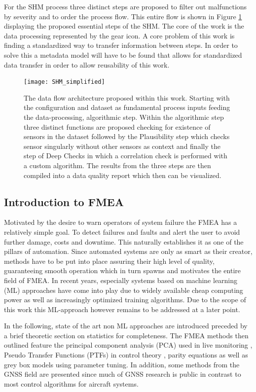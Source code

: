 For the SHM process three distinct steps are proposed to filter out malfunctions by severity and to order the process flow. This entire flow is shown in Figure \ref{fig:SHM_simplified} displaying the proposed essential  steps of the SHM. The core of the work is the data processing represented by the gear icon. A core problem of this work is finding a standardized way to transfer information between steps. In order to solve this a metadata model will have to be found that allows for standardized data transfer in order to allow reusability of this work.
\begin{figure}[!h]
    \centering
    \texttt{[image: SHM\_simplified]}
    \caption[The general, proposed SHM Architecture]{The data flow architecture proposed within this work. Starting with the configuration and dataset as fundamental process inputs feeding the data-processing, algorithmic step. Within the algorithmic step three distinct functions are proposed checking for existence of sensors in the dataset followed by the Plausibility step which checks sensor singularly without other sensors as context and finally the step of Deep Checks in which a correlation check is performed with a custom algorithm. The results from the three steps are then compiled into a data quality report which then can be visualized.}
    \label{fig:SHM_simplified}
\end{figure}

\subsection{Introduction to FMEA}

Motivated by the desire to warn operators of system failure the FMEA has a relatively simple goal. To detect failures and faults and alert the user to avoid further damage, costs and downtime. This naturally establishes it as one of the pillars of automation. \cite{isermann_fault-diagnosis_2006} Since automated systems are only as smart as their creator, methods have to be put into place assuring their high level of quality, guaranteeing smooth operation which in turn spawns and motivates the entire field of FMEA. In recent years, especially systems based on machine learning (ML) approaches have come into play due to widely available cheap computing power as well as increasingly optimized training algorithms. Due to the scope of this work this ML-approach however remains to be addressed at a later point.


In the following, state of the art non ML approaches are introduced preceded by a brief theoretic section on statistics for completeness. The FMEA methods then outlined feature the principal component analysis (PCA) used in live monitoring \cite{xiao_diagnostic_2006}, Pseudo Transfer Functions (PTFs) in control theory \cite{aljanaideh_aircraft_2015}, parity equations as well as grey box models using parameter tuning. \cite{isermann_fault-diagnosis_2006} In addition, some methods from the GNSS field are presented since much of GNSS research is public in contrast to most control algorithms for aircraft systems.

